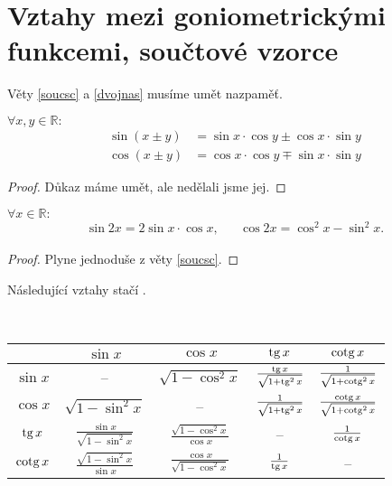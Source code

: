 \section{Vztahy mezi goniometrickými funkcemi, součtové vzorce}
\begin{pozn}
    Věty \ref{soucsc} a \ref{dvojnas}
    musíme umět nazpaměť.
\end{pozn}

\begin{veta}\label{soucsc}
    $\forall x, y \in \mathbb{R}: $
    \begin{align*}
        \sin \left(x\pm y\right) & = \sin x \cdot \cos y \pm \cos x \cdot \sin y \\
        \cos \left(x\pm y\right) & = \cos x \cdot \cos y \mp \sin x \cdot \sin y
    \end{align*}
\end{veta}

\begin{proof}
    Důkaz máme umět, ale nedělali jsme jej.
\end{proof}



\begin{veta}\label{dvojnas}
    $ \forall x \in \mathbb{R}:$
    \begin{align*}
        \sin 2x = 2\sin x \cdot \cos x, & & \cos 2x = \cos^2 x - \sin^2 x.
    \end{align*}
\end{veta}

\begin{proof}
    Plyne jednoduše z věty \ref{soucsc}.
\end{proof}

\begin{pozn}
    Následující vztahy stačí .
\end{pozn}

\begin{veta}\label{vyjadrenigonf}
  \,\\
  \begin{tabular}{| c || c | c | c | c |}
    \hline
    & $\sin x$ & $\cos x$ & $\operatorname{tg} x$ & $\operatorname{cotg} x$ \\
    \hline\hline
    $\sin x$ & -- & $\sqrt{1-\cos^2 x}$ & $\frac{\operatorname{tg} x}{\sqrt{1+\operatorname{tg}^2 x}}$ & $\frac{1}{\sqrt{1+\operatorname{cotg}^2 x}}$\\
    \hline
    $\cos x$ & $\sqrt{1-\sin^2 x}$ & -- & $\frac{1}{\sqrt{1+\operatorname{tg}^2 x}}$ & $\frac{\operatorname{cotg} x}{\sqrt{1+\operatorname{cotg}^2 x}}$\\
    \hline
    $\operatorname{tg} x$ & $\frac{\sin x}{\sqrt{1-\sin^2 x}}$ &  $\frac{\sqrt{1-\cos^2 x}}{\cos x}$ & -- & $\frac{1}{\operatorname{cotg} x}$\\
    \hline
    $\operatorname{cotg} x$ & $\frac{\sqrt{1-\sin^2 x}}{\sin x}$ & $\frac{\cos x}{\sqrt{1-\cos^2 x}}$ & $\frac{1}{\operatorname{tg} x}$ & --\\
    \hline
  \end{tabular}

\end{veta}



